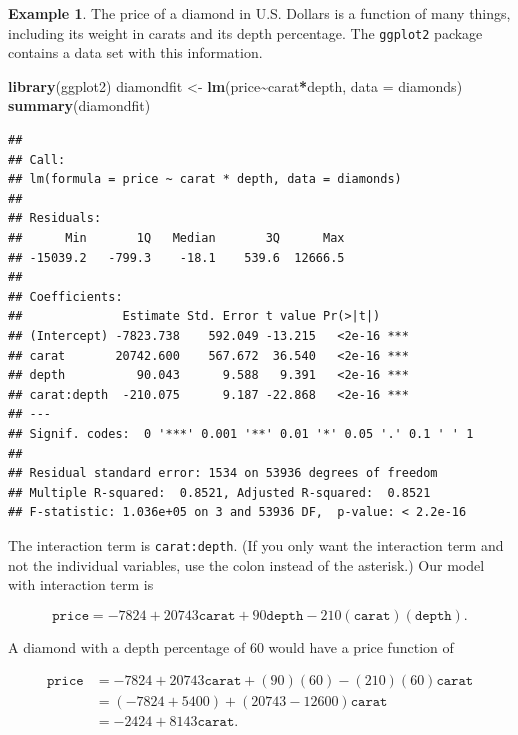\documentclass[
]{book}
\newenvironment{Shaded}{\begin{snugshade}}{\end{snugshade}}
\newcommand{\AttributeTok}[1]{\textcolor[rgb]{0.13,0.29,0.53}{#1}}
\newcommand{\FunctionTok}[1]{\textcolor[rgb]{0.13,0.29,0.53}{\textbf{#1}}}
\newcommand{\NormalTok}[1]{#1}
\newcommand{\OtherTok}[1]{\textcolor[rgb]{0.56,0.35,0.01}{#1}}
\newcommand{\SpecialCharTok}[1]{\textcolor[rgb]{0.81,0.36,0.00}{\textbf{#1}}}
\theoremstyle{definition}
\theoremstyle{definition}
\newtheorem{example}{Example}[chapter]
\theoremstyle{definition}
\theoremstyle{definition}
\theoremstyle{remark}
\begin{document}
\begin{examplebox}

\begin{example}
The price of a diamond in U.S. Dollars is a function of many things, including its weight in carats and its depth percentage. The \texttt{ggplot2} package contains a data set with this information.

\begin{Shaded}
\begin{Highlighting}[]
\FunctionTok{library}\NormalTok{(ggplot2)}
\NormalTok{diamondfit }\OtherTok{\textless{}{-}} \FunctionTok{lm}\NormalTok{(price}\SpecialCharTok{\textasciitilde{}}\NormalTok{carat}\SpecialCharTok{*}\NormalTok{depth, }\AttributeTok{data =}\NormalTok{ diamonds)}
\FunctionTok{summary}\NormalTok{(diamondfit)}
\end{Highlighting}
\end{Shaded}

\begin{verbatim}
## 
## Call:
## lm(formula = price ~ carat * depth, data = diamonds)
## 
## Residuals:
##      Min       1Q   Median       3Q      Max 
## -15039.2   -799.3    -18.1    539.6  12666.5 
## 
## Coefficients:
##              Estimate Std. Error t value Pr(>|t|)    
## (Intercept) -7823.738    592.049 -13.215   <2e-16 ***
## carat       20742.600    567.672  36.540   <2e-16 ***
## depth          90.043      9.588   9.391   <2e-16 ***
## carat:depth  -210.075      9.187 -22.868   <2e-16 ***
## ---
## Signif. codes:  0 '***' 0.001 '**' 0.01 '*' 0.05 '.' 0.1 ' ' 1
## 
## Residual standard error: 1534 on 53936 degrees of freedom
## Multiple R-squared:  0.8521, Adjusted R-squared:  0.8521 
## F-statistic: 1.036e+05 on 3 and 53936 DF,  p-value: < 2.2e-16
\end{verbatim}

The interaction term is \texttt{carat:depth}. (If you only want the interaction term and not the individual variables, use the colon instead of the asterisk.) Our model with interaction term is

\[\texttt{price}=-7824+20743\texttt{carat}+90\texttt{depth}-210(\texttt{carat})(\texttt{depth}).\]

A diamond with a depth percentage of 60 would have a price function of

\begin{align*} 
\texttt{price}&=-7824+20743\texttt{carat}+(90)(60)-(210)(60)\texttt{carat}\\
&=(-7824+5400)+(20743-12600)\texttt{carat}\\
&=-2424+8143\texttt{carat}.
\end{align*}
\end{example}

\end{examplebox}
\end{document}
